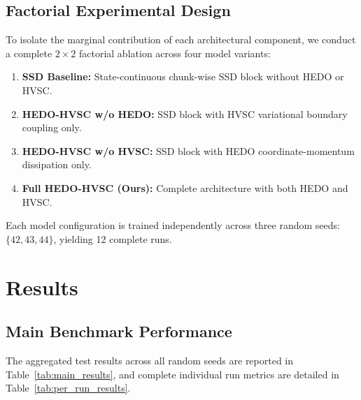 \documentclass[11pt,journal,onecolumn,draftcls]{IEEEtran}
\begin{document}
\subsection{Factorial Experimental Design}
To isolate the marginal contribution of each architectural component, we conduct a complete $2 \times 2$ factorial ablation across four model variants:
\begin{enumerate}
    \item \textbf{SSD Baseline:} State-continuous chunk-wise SSD block without HEDO or HVSC.
    \item \textbf{HEDO-HVSC w/o HEDO:} SSD block with HVSC variational boundary coupling only.
    \item \textbf{HEDO-HVSC w/o HVSC:} SSD block with HEDO coordinate-momentum dissipation only.
    \item \textbf{Full HEDO-HVSC (Ours):} Complete architecture with both HEDO and HVSC.
\end{enumerate}
Each model configuration is trained independently across three random seeds: $\{42, 43, 44\}$, yielding 12 complete runs.

\section{Results}
\label{sec:results}

\subsection{Main Benchmark Performance}
The aggregated test results across all random seeds are reported in Table~\ref{tab:main_results}, and complete individual run metrics are detailed in Table~\ref{tab:per_run_results}.
\end{document}
